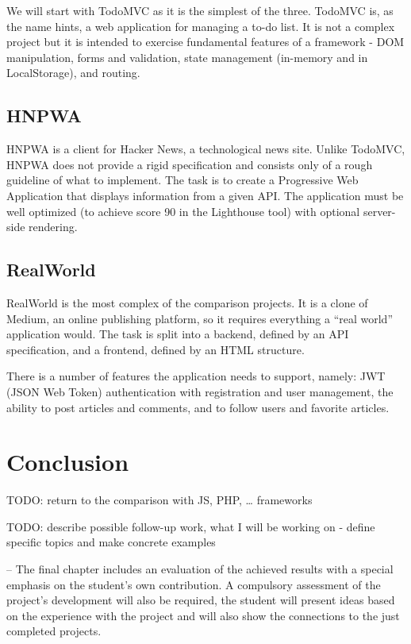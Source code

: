 \documentclass[english,odsaz]{fitthesis}
\begin{document}
We will start with TodoMVC as it is the simplest of the three. TodoMVC is, as
the name hints, a web application for managing a to-do list. It is not a complex
project but it is intended to exercise fundamental features of a framework - DOM
manipulation, forms and validation, state management (in-memory and in
LocalStorage), and routing.

\section{HNPWA}
\label{sec:orga17bf9b}
HNPWA \cite{hnpwa} is a client for Hacker News, a technological news site. Unlike TodoMVC,
HNPWA does not provide a rigid specification and consists only of a rough
guideline of what to implement. The task is to create a Progressive Web
Application that displays information from a given API. The application must be
well optimized (to achieve score 90 in the Lighthouse tool) with optional
server-side rendering.

\section{RealWorld}
\label{sec:org295bddb}
RealWorld \cite{realworld} is the most complex of the comparison projects. It is a clone of
Medium, an online publishing platform, so it requires everything a ``real world''
application would. The task is split into a backend, defined by an API
specification, and a frontend, defined by an HTML structure.

There is a number of features the application needs to support, namely: JWT
(JSON Web Token) authentication with registration and user management, the
ability to post articles and comments, and to follow users and favorite articles.

\chapter{Conclusion}
\label{sec:orgefb0e35}
TODO: return to the comparison with JS, PHP, \ldots{} frameworks

TODO: describe possible follow-up work, what I will be working on - define
specific topics and make concrete examples

-- The final chapter includes an evaluation of the achieved results with a special
emphasis on the student's own contribution. A compulsory assessment of the
project's development will also be required, the student will present ideas
based on the experience with the project and will also show the connections to
the just completed projects. \cite{Pravidla}
\end{document}
